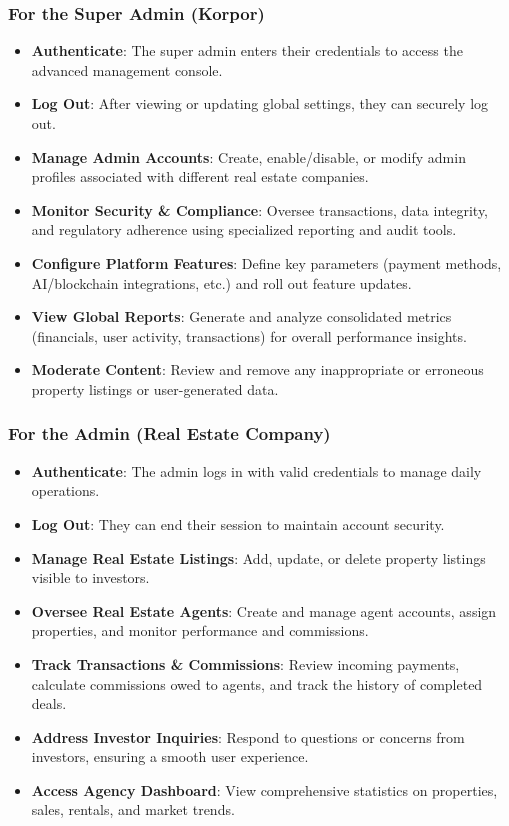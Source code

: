 \subsubsection{For the Super Admin (Korpor)}
\begin{itemize}
    \item \textbf{Authenticate}: The super admin enters their credentials to access the advanced management console.
    \item \textbf{Log Out}: After viewing or updating global settings, they can securely log out.
    \item \textbf{Manage Admin Accounts}: Create, enable/disable, or modify admin profiles associated with different real estate companies.
    \item \textbf{Monitor Security \& Compliance}: Oversee transactions, data integrity, and regulatory adherence using specialized reporting and audit tools.
    \item \textbf{Configure Platform Features}: Define key parameters (payment methods, AI/blockchain integrations, etc.) and roll out feature updates.
    \item \textbf{View Global Reports}: Generate and analyze consolidated metrics (financials, user activity, transactions) for overall performance insights.
    \item \textbf{Moderate Content}: Review and remove any inappropriate or erroneous property listings or user-generated data.
\end{itemize} 

\subsubsection{For the Admin (Real Estate Company)}
\begin{itemize}
    \item \textbf{Authenticate}: The admin logs in with valid credentials to manage daily operations.
    \item \textbf{Log Out}: They can end their session to maintain account security.
    \item \textbf{Manage Real Estate Listings}: Add, update, or delete property listings visible to investors.
    \item \textbf{Oversee Real Estate Agents}: Create and manage agent accounts, assign properties, and monitor performance and commissions.
    \item \textbf{Track Transactions \& Commissions}: Review incoming payments, calculate commissions owed to agents, and track the history of completed deals.
    \item \textbf{Address Investor Inquiries}: Respond to questions or concerns from investors, ensuring a smooth user experience.
    \item \textbf{Access Agency Dashboard}: View comprehensive statistics on properties, sales, rentals, and market trends.
\end{itemize}


